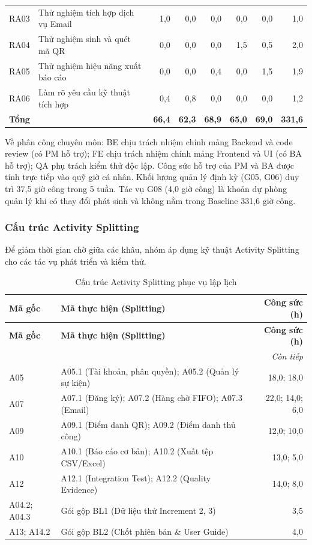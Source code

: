 \begin{longtable}{@{}lp{.30\linewidth}*{6}{r}@{}}
RA03 & Thử nghiệm tích hợp dịch vụ Email & 1,0 & 0,0 & 0,0 & 0,0 & 0,0 & 1,0 \\
RA04 & Thử nghiệm sinh và quét mã QR & 0,0 & 0,0 & 0,0 & 1,5 & 0,5 & 2,0 \\
RA05 & Thử nghiệm hiệu năng xuất báo cáo & 0,0 & 0,0 & 0,4 & 0,0 & 1,5 & 1,9 \\
RA06 & Làm rõ yêu cầu kỹ thuật tích hợp & 0,4 & 0,8 & 0,0 & 0,0 & 0,0 & 1,2 \\
\textbf{Tổng} &  & \textbf{66,4} & \textbf{62,3} & \textbf{68,9} & \textbf{65,0} & \textbf{69,0} & \textbf{331,6} \\
\end{longtable}\endgroup

Về phân công chuyên môn: BE chịu trách nhiệm chính mảng Backend và code review (có PM hỗ trợ); FE chịu trách nhiệm chính mảng Frontend và UI (có BA hỗ trợ); QA phụ trách kiểm thử độc lập. Công sức hỗ trợ của PM và BA được tính trực tiếp vào quỹ giờ cá nhân. Khối lượng quản lý định kỳ (G05, G06) duy trì 37,5 giờ công trong 5 tuần. Tác vụ G08 (4,0 giờ công) là khoản dự phòng quản lý khi có thay đổi phát sinh và không nằm trong Baseline 331,6 giờ công.

\subsubsection{Cấu trúc Activity Splitting}

Để giảm thời gian chờ giữa các khâu, nhóm áp dụng kỹ thuật Activity Splitting cho các tác vụ phát triển và kiểm thử.

\begingroup\small
\setlength{\tabcolsep}{4pt}\renewcommand{\arraystretch}{1.15}
\begin{longtable}{@{}lp{.52\linewidth}r@{}}
\caption{Cấu trúc Activity Splitting phục vụ lập lịch}\label{tab:split}\\
\toprule
\textbf{Mã gốc} & \textbf{Mã thực hiện (Splitting)} & \textbf{Công sức (h)} \\
\midrule\endfirsthead
\toprule
\textbf{Mã gốc} & \textbf{Mã thực hiện (Splitting)} & \textbf{Công sức (h)} \\
\midrule\endhead
\midrule\multicolumn{3}{r}{\textit{Còn tiếp}}\\\endfoot
\bottomrule\endlastfoot
A05 & A05.1 (Tài khoản, phân quyền); A05.2 (Quản lý sự kiện) & 18,0; 18,0 \\
A07 & A07.1 (Đăng ký); A07.2 (Hàng chờ FIFO); A07.3 (Email) & 22,0; 14,0; 6,0 \\
A09 & A09.1 (Điểm danh QR); A09.2 (Điểm danh thủ công) & 12,0; 10,0 \\
A10 & A10.1 (Báo cáo cơ bản); A10.2 (Xuất tệp CSV/Excel) & 13,0; 5,0 \\
A12 & A12.1 (Integration Test); A12.2 (Quality Evidence) & 14,0; 8,0 \\
A04.2; A04.3 & Gói gộp BL1 (Dữ liệu thử Increment 2, 3) & 3,5 \\
A13; A14.2 & Gói gộp BL2 (Chốt phiên bản \& User Guide) & 4,0 \\
\end{longtable}\endgroup

